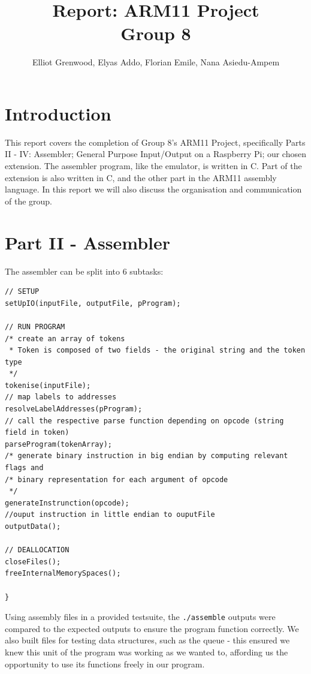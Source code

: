 \documentclass[11pt]{article}
\begin{document}
\title{Report: ARM11 Project \\ Group 8}
\author{Elliot Grenwood, Elyas Addo, Florian Emile, Nana Asiedu-Ampem}

\maketitle

\section{Introduction}
This report covers the completion of Group 8's ARM11 Project, specifically Parts II - IV: Assembler; General Purpose Input/Output on a Raspberry Pi; our chosen extension. The assembler program, like the emulator, is written in C. Part of the extension is also written in C, and the other part in the ARM11 assembly language. In this report we will also discuss the organisation and communication of the group.

\section{Part II - Assembler}
The assembler can be split into 6 subtasks:\newline

\begin{lstlisting}
// SETUP
setUpIO(inputFile, outputFile, pProgram);

// RUN PROGRAM
/* create an array of tokens
 * Token is composed of two fields - the original string and the token type
 */
tokenise(inputFile);
// map labels to addresses
resolveLabelAddresses(pProgram);
// call the respective parse function depending on opcode (string field in token)
parseProgram(tokenArray);
/* generate binary instruction in big endian by computing relevant flags and
/* binary representation for each argument of opcode
 */
generateInstrunction(opcode);
//ouput instruction in little endian to ouputFile
outputData();

// DEALLOCATION
closeFiles();
freeInternalMemorySpaces();

}
\end{lstlisting}

Using assembly files in a provided testsuite, the \texttt{./assemble} outputs were compared to the expected outputs to ensure the program function correctly. We also built files for testing data structures, such as the queue - this ensured we knew this unit of the program was working as we wanted to, affording us the opportunity to use its functions freely in our program.
\end{document}
